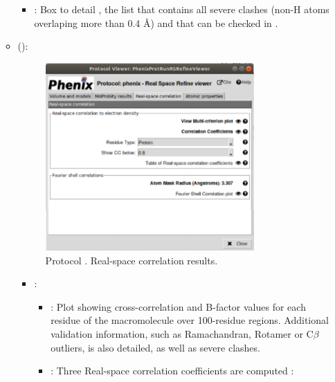 \begin{itemize}
\begin{itemize}
\begin{itemize}
         \item {}: Box to detail , the list that contains all severe clashes (non-H atoms overlaping more than 0.4 \AA) and that can be checked in \coot.
        \end{itemize}
      \item {} ():
       \begin{figure}[H]
         \centering 
         \captionsetup{width=.7\linewidth} 
         \includegraphics[width=0.80\textwidth]{Images_appendix/Fig151.pdf}
         \caption{Protocol . Real-space correlation results.}
         \label{fig:app_protocol_real_space_refine_4}
        \end{figure}
        \begin{itemize}
         \item {}: 
         \begin{itemize}
          \item {}: Plot showing cross-correlation and B-factor values for each residue of the macromolecule over 100-residue regions. Additional validation information, such as Ramachandran, Rotamer or C{$\beta$} outliers, is also detailed, as well as severe clashes.  
          \item {}: Three Real-space correlation coefficients are computed \citep{afonine2018b}: \setlength{\parindent}{12pt}\\
          

\end{itemize}
\end{itemize}
\end{itemize}
\end{itemize}
